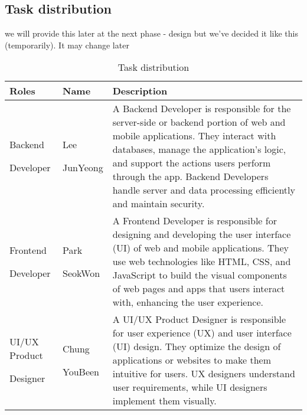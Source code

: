 \documentclass[conference]{IEEEtran}
\begin{document}
\subsection{Task distribution}
we will provide this later at the next phase - design
but we've decided it like this (temporarily). It may change later
\begin{table}[ht]
\caption{Task distribution}
\begin{tabular}{| p{1.7cm}|p{1.5cm}|p{4.3cm} |}

\hline
Roles & Name & Description\\
\hline
Backend  \par Developer
& Lee \par JunYeong 
& A Backend Developer is responsible for the server-side or backend portion of web and mobile applications. They interact with databases, manage the application's logic, and support the actions users perform through the app. Backend Developers handle server and data processing efficiently and maintain security. \\

\hline
Frontend \par Developer
& Park \par SeokWon 
& A Frontend Developer is responsible for designing and developing the user interface (UI) of web and mobile applications. They use web technologies like HTML, CSS, and JavaScript to build the visual components of web pages and apps that users interact with, enhancing the user experience. \\
\hline
UI/UX Product \par Designer
& Chung \par YouBeen 
& A UI/UX Product Designer is responsible for user experience (UX) and user interface (UI) design. They optimize the design of applications or websites to make them intuitive for users. UX designers understand user requirements, while UI designers implement them visually.
 \\
\hline
\end{tabular}
\end{table}
\end{document}
